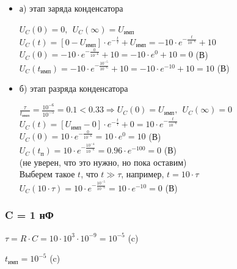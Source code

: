 \begin{itemize}
\item[] а) этап заряда конденсатора

		$U_C(0) = 0,\ \ U_C(\infty) = U_\text{имп}$\\
		$U_C(t) = [0 - U_\text{имп}] \cdot e^{-\frac{t}{\tau}} + U_\text{имп} = -10 \cdot e^{-\frac{t}{10^{-6}}} + 10$\\
		$U_C(0) = -10 \cdot e^{-\frac{0}{10^{-6}}} + 10 = -10 \cdot e^0 + 10 = 0$ (В)\\
		$U_C(t_\text{имп}) = -10 \cdot e^{-\frac{10^{-5}}{10^{-6}}} + 10 = -10 \cdot e^{-10} + 10 = 10$ (В)\\

\item[] б) этап разряда конденсатора
		
		$\frac{\tau}{t_\text{имп}} = \frac{10^{-6}}{10^{-5}} = 0.1 < 0.33 \Rightarrow U_C(0) = U_\text{имп},\ \ U_C(\infty) = 0$\\
		$U_C(t) = [U_\text{имп} - 0] \cdot e^{-\frac{t}{\tau}} + 0 = 10 \cdot e^{-\frac{t}{10^{-6}}}$\\
		$U_C(0) = 10 \cdot e^{-\frac{0}{10^{-6}}} = 10 \cdot e^0 = 10$ (В)\\
		$U_C(t_\text{п}) = 10 \cdot e^{-\frac{10^{-4}}{10^{-6}}} = 0.96 \cdot e^{-100} = 0$ (В)\\
		(не уверен, что это нужно, но пока оставим)\\
		Выберем такое $t$, что $t \gg \tau$, например, $t = 10 \cdot \tau$ \\
		$U_C(10 \cdot \tau) = 10 \cdot e^{-\frac{10^{-5}}{10^{-6}}} = 10 \cdot e^{-10} = 0$ (В)\\
\end{itemize}

\subsubsection{C = 1 нФ}

		$\tau = R \cdot C = 10 \cdot 10^3 \cdot 10^{-9} = 10^{-5}$ (c)
		
		$t_\text{имп} = 10^{-5}$ (c)

